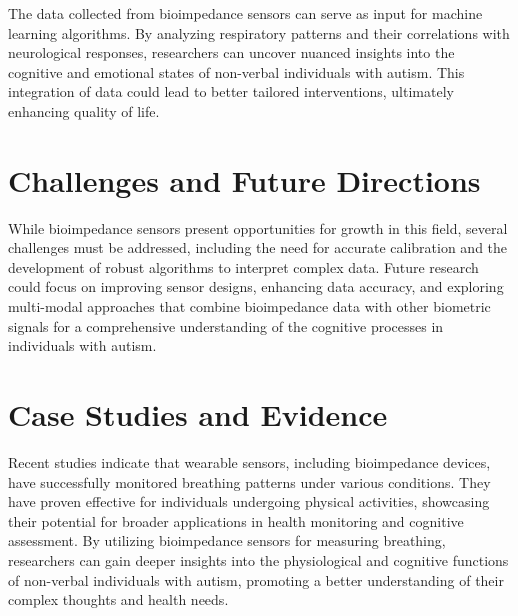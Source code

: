 \documentclass[twocolumn]{article}
\begin{document}
The data collected from bioimpedance sensors can serve as input for machine learning algorithms. By analyzing respiratory patterns and their correlations with neurological responses, researchers can uncover nuanced insights into the cognitive and emotional states of non-verbal individuals with autism.\cite{Serrano-Finetti_Hornero_Casas_2022} This integration of data could lead to better tailored interventions, ultimately enhancing quality of life.

\section{Challenges and Future Directions}

While bioimpedance sensors present opportunities for growth in this field, several challenges must be addressed, including the need for accurate calibration and the development of robust algorithms to interpret complex data. Future research could focus on improving sensor designs, enhancing data accuracy, and exploring multi-modal approaches that combine bioimpedance data with other biometric signals for a comprehensive understanding of the cognitive processes in individuals with autism.

\section{Case Studies and Evidence}

Recent studies indicate that wearable sensors, including bioimpedance devices, have successfully monitored breathing patterns under various conditions.\cite{Yang_Huang_Weng_Liu_Chen_2024} They have proven effective for individuals undergoing physical activities, showcasing their potential for broader applications in health monitoring and cognitive assessment. 
By utilizing bioimpedance sensors for measuring breathing, researchers can gain deeper insights into the physiological and cognitive functions of non-verbal individuals with autism, promoting a better understanding of their complex thoughts and health needs.


\end{document}
